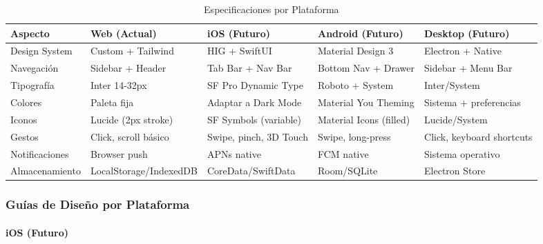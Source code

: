\documentclass[12pt,a4paper,oneside]{article}
\begin{document}
\begin{table}[h]
\centering
\caption{Especificaciones por Plataforma}
\label{tab:plataformas-comparacion}
\tiny
\begin{tabular}{|l|p{3cm}|p{3cm}|p{3cm}|p{3cm}|}
\hline
\textbf{Aspecto} & \textbf{Web (Actual)} & \textbf{iOS (Futuro)} & \textbf{Android (Futuro)} & \textbf{Desktop (Futuro)} \\
\hline
Design System & Custom + Tailwind & HIG + SwiftUI & Material Design 3 & Electron + Native \\
\hline
Navegación & Sidebar + Header & Tab Bar + Nav Bar & Bottom Nav + Drawer & Sidebar + Menu Bar \\
\hline
Tipografía & Inter 14-32px & SF Pro Dynamic Type & Roboto + System & Inter/System \\
\hline
Colores & Paleta fija & Adaptar a Dark Mode & Material You Theming & Sistema + preferencias \\
\hline
Iconos & Lucide (2px stroke) & SF Symbols (variable) & Material Icons (filled) & Lucide/System \\
\hline
Gestos & Click, scroll básico & Swipe, pinch, 3D Touch & Swipe, long-press & Click, keyboard shortcuts \\
\hline
Notificaciones & Browser push & APNs native & FCM native & Sistema operativo \\
\hline
Almacenamiento & LocalStorage/IndexedDB & CoreData/SwiftData & Room/SQLite & Electron Store \\
\hline
\end{tabular}
\end{table}

\subsubsection{Guías de Diseño por Plataforma}

\paragraph{iOS (Futuro)}
\end{document}
